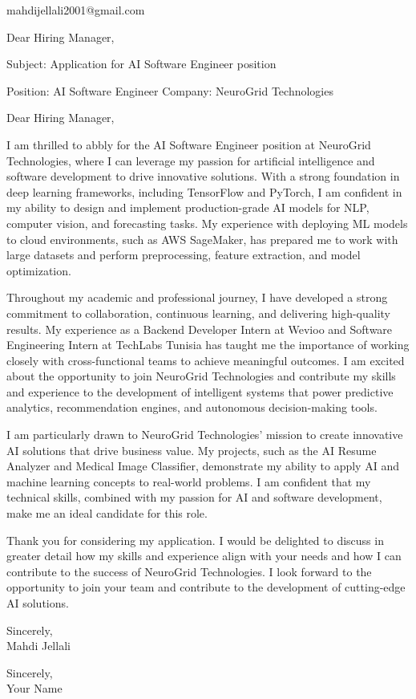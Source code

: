\documentclass[11pt,a4paper]{letter}
\begin{document}
\begin{letter}{mahdijellali2001@gmail.com}

\opening{Dear Hiring Manager,}

Subject: Application for AI Software Engineer position

Position: AI Software Engineer
Company: NeuroGrid Technologies

Dear Hiring Manager,

I am thrilled to abbly for the AI Software Engineer position at NeuroGrid Technologies, where I can leverage my passion for artificial intelligence and software development to drive innovative solutions. With a strong foundation in deep learning frameworks, including TensorFlow and PyTorch, I am confident in my ability to design and implement production-grade AI models for NLP, computer vision, and forecasting tasks. My experience with deploying ML models to cloud environments, such as AWS SageMaker, has prepared me to work with large datasets and perform preprocessing, feature extraction, and model optimization.

Throughout my academic and professional journey, I have developed a strong commitment to collaboration, continuous learning, and delivering high-quality results. My experience as a Backend Developer Intern at Wevioo and Software Engineering Intern at TechLabs Tunisia has taught me the importance of working closely with cross-functional teams to achieve meaningful outcomes. I am excited about the opportunity to join NeuroGrid Technologies and contribute my skills and experience to the development of intelligent systems that power predictive analytics, recommendation engines, and autonomous decision-making tools.

I am particularly drawn to NeuroGrid Technologies' mission to create innovative AI solutions that drive business value. My projects, such as the AI Resume Analyzer and Medical Image Classifier, demonstrate my ability to apply AI and machine learning concepts to real-world problems. I am confident that my technical skills, combined with my passion for AI and software development, make me an ideal candidate for this role.

Thank you for considering my application. I would be delighted to discuss in greater detail how my skills and experience align with your needs and how I can contribute to the success of NeuroGrid Technologies. I look forward to the opportunity to join your team and contribute to the development of cutting-edge AI solutions.

Sincerely,\\[12pt]

Mahdi Jellali

\closing{Sincerely,\\Your Name}

\end{letter}
\end{document}
